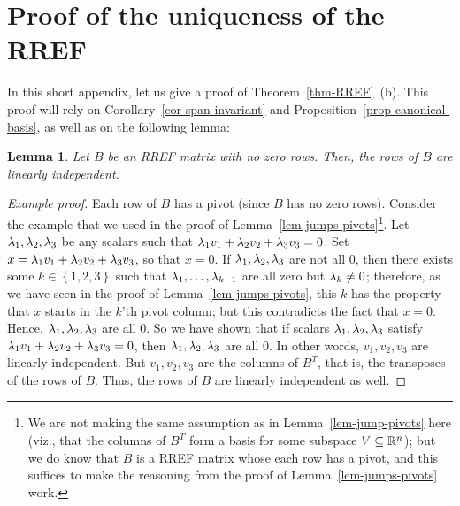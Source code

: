 \documentclass[reqno]{amsart}
\newtheorem{lemma}[theorem]{Lemma}
\theoremstyle{definition}
\begin{document}
\section{Proof of the uniqueness of the RREF}
\label{apx-RREF-uniq}

In this short appendix, let us give a proof of
Theorem~\ref{thm-RREF}~(b).
This proof will rely on Corollary~\ref{cor-span-invariant}
and Proposition~\ref{prop-canonical-basis},
as well as on the following lemma:

\begin{lemma}\label{lem-RREF-lin-ind}
 Let $B$ be an RREF matrix with no zero rows.
 Then, the rows of $B$ are linearly independent.
\end{lemma}
\begin{proof}[Example proof]
 Each row of $B$ has a pivot (since $B$ has no zero rows).
 Consider the example that we used in the proof of
 Lemma~\ref{lem-jumps-pivots}\footnote{We are not making the same assumption
 as in Lemma~\ref{lem-jump-pivots} here (viz., that
 the columns of $B^T$ form a basis for some subspace
 $V \subseteq {\mathbb{R}}^n$); but we do know that $B$ is a
 RREF matrix whose each row has a pivot, and this
 suffices to make the reasoning from the proof of
 Lemma~\ref{lem-jumps-pivots} work.}.
 Let $\lambda_1, \lambda_2, \lambda_3$ be any scalars
 such that $\lambda_1 v_1 + \lambda_2 v_2 + \lambda_3 v_3 = 0$.
 Set $x = \lambda_1 v_1 + \lambda_2 v_2 + \lambda_3 v_3$,
 so that $x = 0$.
 If $\lambda_1, \lambda_2, \lambda_3$ are not all $0$,
 then there exists some $k \in \left\{1,2,3\right\}$
 such that $\lambda_1,\dotsc,\lambda_{k-1}$ are all
 zero but $\lambda_k\neq 0$;
 therefore, as we have seen in the proof of
 Lemma~\ref{lem-jumps-pivots}, this $k$
 has the property that $x$ starts in the $k$'th pivot
 column;
 but this contradicts the fact that $x = 0$.
 Hence, $\lambda_1, \lambda_2, \lambda_3$ are all $0$.
 So we have shown that if scalars $\lambda_1, \lambda_2, \lambda_3$
 satisfy $\lambda_1 v_1 + \lambda_2 v_2 + \lambda_3 v_3 = 0$,
 then $\lambda_1, \lambda_2, \lambda_3$ are all $0$.
 In other words, $v_1, v_2, v_3$ are linearly independent.
 But $v_1, v_2, v_3$ are the columns of $B^T$, that is,
 the transposes of the rows of $B$.
 Thus, the rows of $B$ are linearly independent as well.
\end{proof}
\end{document}
